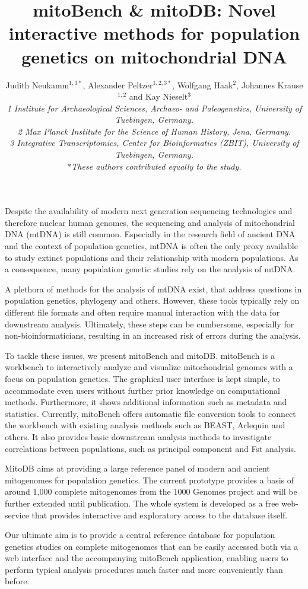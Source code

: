 \documentclass[english]{gcb17abstract}
\title{mitoBench \& mitoDB: Novel interactive methods for population genetics on mitochondrial DNA}
\author{
Judith Neukamm$^{1,3*}$, Alexander Peltzer$^{1,2,3*}$, Wolfgang Haak$^{2}$, Johannes Krause$^{1,2}$ and Kay Nieselt$^{3}$\\ \bigskip
{\normalsize\normalfont\itshape 1 Institute for Archaeological Sciences, Archaeo- and Paleogenetics, University of Tuebingen, Germany. \\2 Max Planck Institute for the Science of Human History, Jena, Germany. \\3 Integrative Transcriptomics, Center for Bioinformatics (ZBIT), University of Tuebingen, Germany. \\$*$These authors contributed equally to the study.}
}
\begin{document}
\maketitle 

Despite the availability of modern next generation sequencing technologies and therefore nuclear human genomes, the sequencing and analysis of mitochondrial DNA (mtDNA) is still common. Especially in the research field of ancient DNA and the context of population genetics, mtDNA is often the only proxy available to study extinct populations and their relationship with modern populations. As a consequence, many population genetic studies rely on the analysis of mtDNA. 

A plethora of methods for the analysis of mtDNA exist, that address questions in population genetics, phylogeny and others. However, these tools typically rely on different file formats and often require manual interaction with the data for downstream analysis. Ultimately, these steps can be cumbersome, especially for non-bioinformaticians, resulting in an increased risk of errors during the analysis. 

To tackle these issues, we present mitoBench and mitoDB. mitoBench is a workbench to interactively analyze and visualize mitochondrial genomes with a focus on population genetics. The graphical user interface is kept simple, to accommodate even users without further prior knowledge on computational methods. Furthermore, it shows additional information such as metadata and statistics. Currently, mitoBench offers automatic file conversion tools to connect the workbench with existing analysis methods such as BEAST\cite{bouckaert2014beast}, Arlequin\cite{excoffier2005arlequin} and others. It also provides basic downstream analysis methods to investigate correlations between populations, such as principal component and Fst analysis.

MitoDB aims at providing a large reference panel of modern and ancient mitogenomes for population genetics. The current prototype provides a basis of around 1,000 complete mitogenomes from the 1000 Genomes project\cite{siva20081000} and will be further extended until publication. The whole system is developed as a free web-service that provides interactive and exploratory access to the database itself. 

Our ultimate aim is to provide a central reference database for population genetics studies on complete mitogenomes that can be easily accessed both via a web interface and the accompanying mitoBench application, enabling users to perform typical analysis procedures much faster and more conveniently than before. 



\end{document}
